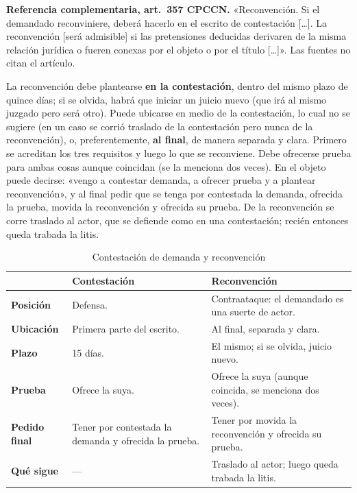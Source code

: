 \documentclass[12pt,oneside]{book}
\begin{document}
\begin{nota}
\textbf{Referencia complementaria, art.~357 CPCCN.}
«Reconvención. Si el demandado reconviniere, deberá hacerlo en el escrito de contestación [\ldots]. La reconvención [será admisible] si las pretensiones deducidas derivaren de la misma relación jurídica o fueren conexas por el objeto o por el título [\ldots]». Las fuentes no citan el artículo.
\end{nota}

La reconvención debe plantearse \textbf{en la contestación}, dentro del mismo plazo de quince días; si se olvida, habrá que iniciar un juicio nuevo (que irá al mismo juzgado pero será otro). Puede ubicarse en medio de la contestación, lo cual no se sugiere (en un caso se corrió traslado de la contestación pero nunca de la reconvención), o, preferentemente, \textbf{al final}, de manera separada y clara. Primero se acreditan los tres requisitos y luego lo que se reconviene. Debe ofrecerse prueba para ambas cosas aunque coincidan (se la menciona dos veces). En el objeto puede decirse: «vengo a contestar demanda, a ofrecer prueba y a plantear reconvención», y al final pedir que se tenga por contestada la demanda, ofrecida la prueba, movida la reconvención y ofrecida su prueba. De la reconvención se corre traslado al actor, que se defiende como en una contestación; recién entonces queda trabada la litis.

\begin{table}[H]
\centering
\caption{Contestación de demanda y reconvención}
\begin{tabularx}{\textwidth}{>{\raggedright\arraybackslash\bfseries}p{} X X}
\toprule
 & Contestación & Reconvención \\
\midrule
Posición & Defensa. & Contraataque: el demandado es una suerte de actor. \\
Ubicación & Primera parte del escrito. & Al final, separada y clara. \\
Plazo & 15 días. & El mismo; si se olvida, juicio nuevo. \\
Prueba & Ofrece la suya. & Ofrece la suya (aunque coincida, se menciona dos veces). \\
Pedido final & Tener por contestada la demanda y ofrecida la prueba. & Tener por movida la reconvención y ofrecida su prueba. \\
Qué sigue & --- & Traslado al actor; luego queda trabada la litis. \\
\bottomrule
\end{tabularx}
\end{table}
\end{document}

